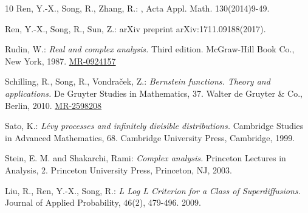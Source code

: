 \documentclass[12pt,a4paper]{amsart}
\def\MR#1{\href{http://www.ams.org/mathscinet-getitem?mr=#1}{MR-#1}}
\theoremstyle{plain}
\theoremstyle{definition}
\numberwithin{equation}{section}
\begin{document}
\begin{thebibliography} {10}
Ren, Y.-X., Song, R., Zhang, R.:
, Acta Appl. Math. 130(2014)9-49.

Ren, Y.-X., Song, R., Sun, Z.:
 arXiv preprint arXiv:1711.09188(2017).

Rudin, W.:
\emph{Real and complex analysis.}
Third edition. McGraw-Hill Book Co., New York, 1987.
\MR{0924157}

Schilling, R., Song, R., Vondra\v{c}ek, Z.:
\emph{Bernstein functions. Theory and applications.}
De Gruyter Studies in Mathematics, 37. Walter de Gruyter \& Co., Berlin, 2010.
\MR{2598208}


Sato, K.:
\emph{Lévy processes and infinitely divisible distributions.}
Cambridge Studies in Advanced Mathematics, 68. Cambridge University Press, Cambridge, 1999.

Stein, E. M. and Shakarchi, Rami:
\emph{Complex analysis.}
Princeton Lectures in Analysis, 2. Princeton University Press, Princeton, NJ, 2003.

Liu, R.,  Ren, Y.-X., Song, R.:
\emph{ L Log L Criterion for a Class of Superdiffusions.}
Journal of Applied Probability, 46(2), 479-496. 2009.

\end{thebibliography}
\end{document}
